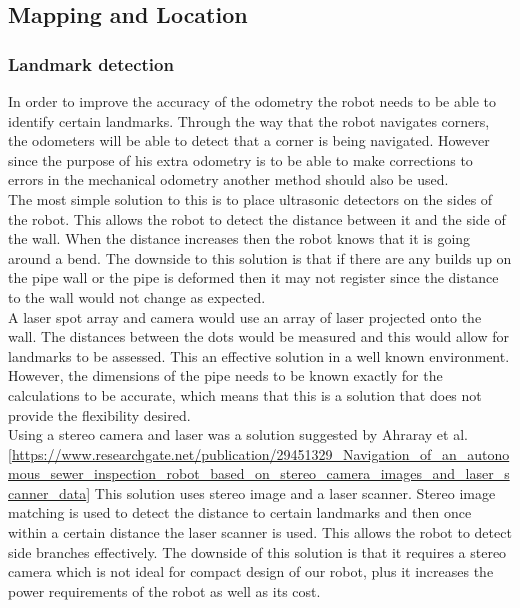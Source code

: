 \documentclass[11pt]{article}		%
\begin{document}
		\subsection{Mapping and Location}

		
		\subsubsection{Landmark detection}
        In order to improve the accuracy of the odometry the robot needs to be able to identify certain landmarks. 
        Through the way that the robot navigates corners, the odometers will be able to detect that a corner is being navigated. 
        However since the purpose of his extra odometry is to be able to make corrections to errors in the mechanical odometry another method should also be used.
        \\
        The most simple solution to this is to place ultrasonic detectors on the sides of the robot. 
        This allows the robot to detect the distance between it and the side of the wall. 
        When the distance increases then the robot knows that it is going around a bend. 
        The downside to this solution is that if there are any builds up on the pipe wall or the pipe is deformed then it may not register since the distance to the wall would not change as expected.
        \\
        A laser spot array and camera would use an array of laser projected onto the wall. 
        The distances between the dots would be measured and this would allow for landmarks to be assessed. 
        This an effective solution in a well known environment. 
        However, the dimensions of the pipe needs to be known exactly for the calculations to be accurate, which means that this is a solution that does not provide the flexibility desired.
        \\
        Using a stereo camera and laser was a solution suggested by Ahraray et al. [\url{https://www.researchgate.net/publication/29451329_Navigation_of_an_autonomous_sewer_inspection_robot_based_on_stereo_camera_images_and_laser_scanner_data}] 
        This solution uses stereo image and a laser scanner. 
        Stereo image matching is used to detect the distance to certain landmarks and then once within a certain distance the laser scanner is used. 
        This allows the robot to detect side branches effectively. 
        The downside of this solution is that it requires a stereo camera which is not ideal for compact design of our robot, plus it increases the power requirements of the robot as well as its cost.
\end{document}
